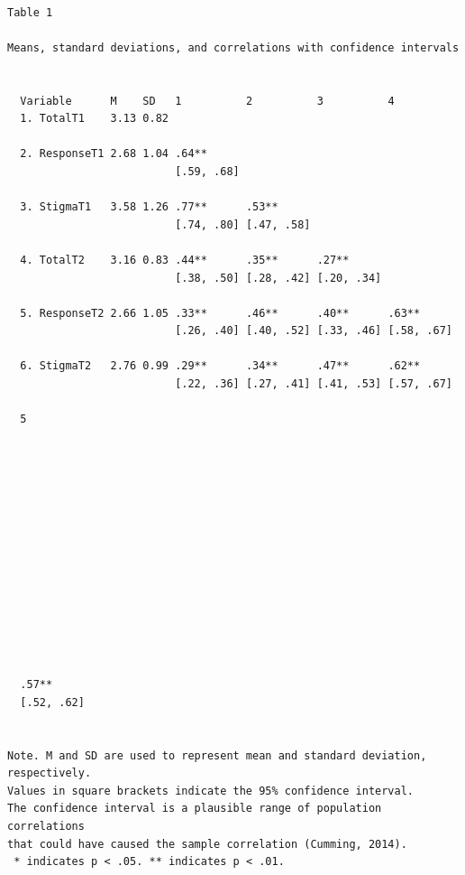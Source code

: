 \documentclass[
  english,
]{book}
\begin{document}
\begin{verbatim}

Table 1 

Means, standard deviations, and correlations with confidence intervals
 

  Variable      M    SD   1          2          3          4         
  1. TotalT1    3.13 0.82                                            
                                                                     
  2. ResponseT1 2.68 1.04 .64**                                      
                          [.59, .68]                                 
                                                                     
  3. StigmaT1   3.58 1.26 .77**      .53**                           
                          [.74, .80] [.47, .58]                      
                                                                     
  4. TotalT2    3.16 0.83 .44**      .35**      .27**                
                          [.38, .50] [.28, .42] [.20, .34]           
                                                                     
  5. ResponseT2 2.66 1.05 .33**      .46**      .40**      .63**     
                          [.26, .40] [.40, .52] [.33, .46] [.58, .67]
                                                                     
  6. StigmaT2   2.76 0.99 .29**      .34**      .47**      .62**     
                          [.22, .36] [.27, .41] [.41, .53] [.57, .67]
                                                                     
  5         
            
            
            
            
            
            
            
            
            
            
            
            
            
            
  .57**     
  [.52, .62]
            

Note. M and SD are used to represent mean and standard deviation, respectively.
Values in square brackets indicate the 95% confidence interval.
The confidence interval is a plausible range of population correlations 
that could have caused the sample correlation (Cumming, 2014).
 * indicates p < .05. ** indicates p < .01.
 
\end{verbatim}
\end{document}
